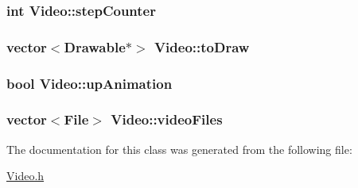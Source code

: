 \subsubsection[{\texorpdfstring{step\+Counter}{stepCounter}}]{\setlength{\rightskip}{0pt plus 5cm}int Video\+::step\+Counter\hspace{0.3cm}{\ttfamily [private]}}\hypertarget{classVideo_a862be3ec8e981fe12e515c21e79f32c0}{}\label{classVideo_a862be3ec8e981fe12e515c21e79f32c0}
\subsubsection[{\texorpdfstring{to\+Draw}{toDraw}}]{\setlength{\rightskip}{0pt plus 5cm}vector$<$Drawable$\ast$$>$ Video\+::to\+Draw\hspace{0.3cm}{\ttfamily [private]}}\hypertarget{classVideo_a6b8b02006dbbe4a6cc2b469024c383a8}{}\label{classVideo_a6b8b02006dbbe4a6cc2b469024c383a8}
\subsubsection[{\texorpdfstring{up\+Animation}{upAnimation}}]{\setlength{\rightskip}{0pt plus 5cm}bool Video\+::up\+Animation\hspace{0.3cm}{\ttfamily [private]}}\hypertarget{classVideo_a997f7ceb635d7897d2eed00cf6faaf19}{}\label{classVideo_a997f7ceb635d7897d2eed00cf6faaf19}
\subsubsection[{\texorpdfstring{video\+Files}{videoFiles}}]{\setlength{\rightskip}{0pt plus 5cm}vector$<${\bf File}$>$ Video\+::video\+Files\hspace{0.3cm}{\ttfamily [private]}}\hypertarget{classVideo_ae6b3a3fcfb9d7379aa39523a70dff6c7}{}\label{classVideo_ae6b3a3fcfb9d7379aa39523a70dff6c7}


The documentation for this class was generated from the following file\+:\begin{DoxyCompactItemize}
\item 
\hyperlink{Video_8h}{Video.\+h}\end{DoxyCompactItemize}
